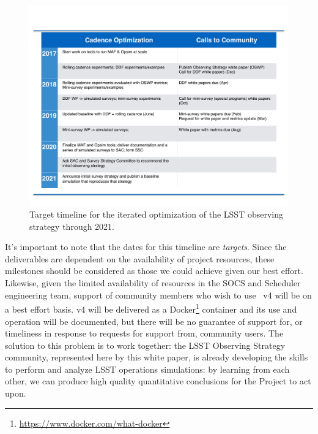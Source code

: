 \begin{figure}[t!]
\centering\includegraphics[angle=0,width=0.95\linewidth,clip]{figs/opsim_timeline.pdf}
\vskip -0.4in
\caption{Target timeline for the iterated optimization of the LSST observing strategy through 2021.}
\label{fig:timeline}
\end{figure}

It's important to note that the dates for this timeline are {\it
targets}. Since the deliverables are dependent on the availability of
project resources, these milestones should be considered as those we
could achieve given our best effort. Likewise, given the limited
availability of resources in the SOCS and Scheduler engineering team,
support of community members who wish to use \OpSim~v4 will be on a best
effort basis. \OpSim v4 will be delivered as a Docker\footnote{\url{https://www.docker.com/what-docker}} container and its
use and operation will be documented, but there will be no guarantee of
support for, or timeliness in response to requests for support from,
community users. The solution to this problem is to work together: the LSST Observing Strategy community, represented here by this white paper, is already developing the skills to perform and analyze LSST operations simulations: by learning from each other, we can produce high quality quantitative conclusions for the Project to act upon.



\navigationbar



